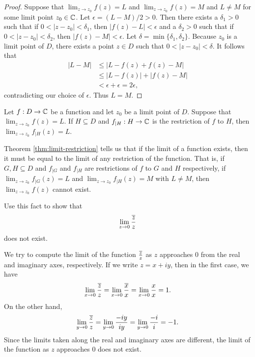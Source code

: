 \begin{proof}
    Suppose that \(\lim_{z \to z_0} f(z) = L\) and \(\lim_{z \to z_0} f(z) = M\) and \(L \neq M\) for some limit point \(z_0 \in \mathbb{C}\). Let \(\epsilon = (L - M)/2 > 0\). Then there exists a \(\delta_1 > 0\) such that if \(0 < |z - z_0| < \delta_1\), then \(|f(z) - L| < \epsilon\) and a \(\delta_2 > 0\) such that if \(0 < |z - z_0| < \delta_2\), then \(|f(z) - M| < \epsilon\). Let \(\delta = \min\{\delta_1, \delta_2\}\). Because \(z_0\) is a limit point of \(D\), there exists a point \(z \in D\) such that \(0 < |z - z_0| < \delta\). It follows that
    \begin{align*}
        |L - M| &\leq |L - f(z) + f(z) - M| \\
        &\leq |L - f(z)| + |f(z) - M| \\
        &< \epsilon + \epsilon = 2\epsilon,
    \end{align*}
    contradicting our choice of \(\epsilon\). Thus \(L = M\).
\end{proof}

\begin{theorem}%
    Let \(f : D \to \mathbb{C}\) be a function and let \(z_0\) be a limit point of \(D\). Suppose that \(\lim_{z \to z_0} f(z) = L\). If \(H \subseteq D\) and \(f_{|H} : H \to \mathbb{C}\) is the restriction of \(f\) to \(H\), then \(\lim_{z \to z_0} f_{|H}(z) = L\).
    \label{thm:limit-restriction}
\end{theorem}

\begin{example}
    \label{ex:limit-zbar-over-z}
    Theorem \ref{thm:limit-restriction} tells us that if the limit of a function exists, then it must be equal to the limit of any restriction of the function. That is, if \(G,H \subseteq D\) and \(f_{|G}\) and \(f_{|H}\) are restrictions of \(f\) to \(G\) and \(H\) respectively, if \(\lim_{z \to z_0} f_{|G}(z) = L\) and \(\lim_{z \to z_0} f_{|H}(z) = M\) with \(L \neq M\), then \(\lim_{z \to z_0} f(z)\) cannot exist.

    Use this fact to show that \[\lim_{z \to 0} \frac{\overline{z}}{z}\] does not exist.

    \begin{solution}
        We try to compute the limit of the function \(\frac{\overline{z}}{z}\) as \(z\) approaches \(0\) from the real and imaginary axes, respectively. If we write \(z = x + iy\), then in the first case, we have
        \[
            \lim_{x \to 0} \frac{\overline{z}}{z} = \lim_{x \to 0} \frac{\overline{x}}{x} = \lim_{x \to 0} \frac{x}{x} = 1.
        \]
        On the other hand,
        \[
            \lim_{y \to 0} \frac{\overline{z}}{z} = \lim_{y \to 0} \frac{-iy}{iy} = \lim_{y \to 0} \frac{-i}{i} = -1.
        \]
        Since the limits taken along the real and imaginary axes are different, the limit of the function as \(z\) approaches \(0\) does not exist.
    \end{solution}
\end{example}



